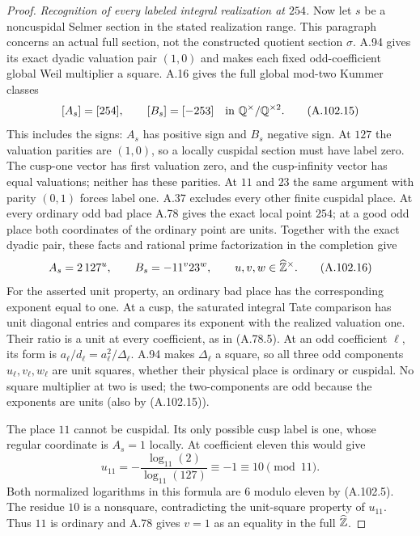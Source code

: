 \begin{proof}
\emph{Recognition of every labeled integral realization at $254$.}
Now let $s$ be a noncuspidal Selmer section in the
stated realization range.  This paragraph concerns
an actual full section, not the constructed quotient
section $\sigma$.
A.94 gives its exact dyadic valuation pair $(1,0)$
and makes each fixed odd-coefficient global Weil
multiplier a square.
A.16 gives the full global mod-two Kummer classes
\[
                  [A_s]=[254],\qquad [B_s]=[-253]
                              \quad\text{in }\mathbb Q^\times/\mathbb Q^{\times2}.
\tag{A.102.15}
\]
This includes the signs: $A_s$ has positive sign
and $B_s$ negative sign.  At $127$ the valuation
parities are $(1,0)$, so a locally cuspidal section
must have label zero.  The cusp-one vector has
first valuation zero, and the cusp-infinity vector
has equal valuations; neither has these parities.
At $11$ and $23$ the same argument with parity
$(0,1)$ forces label one.
A.37 excludes every other finite cuspidal place.
At every ordinary odd bad place A.78 gives the
exact local point $254$; at a good odd place both
coordinates of the ordinary point are units.
Together with the exact dyadic pair, these facts
and rational prime factorization in the completion
give
\[
               A_s=2\,127^u,\qquad
               B_s=-11^v23^w,
                           \qquad u,v,w\in\widehat{\mathbb Z}^\times.
\tag{A.102.16}
\]
For the asserted unit property, an ordinary bad
place has the corresponding exponent equal to
one.  At a cusp, the saturated integral Tate
comparison has unit diagonal entries and compares
its exponent with the realized valuation one.
Their ratio is a unit at every coefficient, as
in (A.78.5).
At an odd coefficient $\ell$, its form is
$a_\ell/d_\ell=a_\ell^2/\Delta_\ell$.
A.94 makes $\Delta_\ell$ a square, so all three
odd components $u_\ell,v_\ell,w_\ell$ are unit
squares, whether their physical place is ordinary
or cuspidal.  No square multiplier at two is used;
the two-components are odd because the exponents
are units (also by (A.102.15)).

The place $11$ cannot be cuspidal.  Its only
possible cusp label is one, whose regular
coordinate is $A_s=1$ locally.  At coefficient
eleven this would give
\[
        u_{11}=-\frac{\log_{11}(2)}{\log_{11}(127)}
                       \equiv-1\equiv10\pmod{11}.
\tag{A.102.17}
\]
Both normalized logarithms in this formula
are $6$ modulo eleven by (A.102.5).
The residue $10$ is a nonsquare, contradicting
the unit-square property of $u_{11}$.
Thus $11$ is ordinary and A.78 gives $v=1$
as an equality in the full $\widehat{\mathbb Z}$.


\end{proof}
